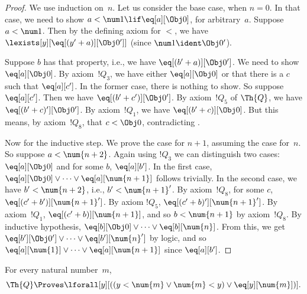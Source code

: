 \documentclass[../../../include/open-logic-section]{subfiles}
\begin{document}
\begin{proof}
We use induction on~$n$. Let us consider the base case, when $n = 0$.
In that case, we need to show $a < \num 1 \lif \eq[a][\Obj 0]$, for
arbitrary~$a$. Suppose $a < \num 1$. Then by the defining axiom for
$<$, we have $\lexists[y][\eq[(y'+a)][\Obj 0']]$ (since $\num 1 \ident
\Obj 0'$).

Suppose $b$ has that property, i.e., we have $\eq[(b'+a)][\Obj 0']$.
We need to show $\eq[a][\Obj 0]$. By axiom~$!Q_3$, we have either
$\eq[a][\Obj 0]$ or that there is a $c$ such that $\eq[a][c']$. In the
former case, there is nothing to show. So suppose $\eq[a][c']$. Then
we have $\eq[(b' + c')][\Obj 0']$. By axiom~$!Q_5$ of $\Th{Q}$, we have
$\eq[(b'+c)'][\Obj 0']$. By axiom~$!Q_1$, we have $\eq[(b' + c)][\Obj
0]$. But this means, by axiom~$!Q_8$, that $c < \Obj 0$, contradicting
.

Now for the inductive step. We prove the case for $n+1$, assuming the
case for~$n$. So suppose $a < \num {n+2}$. Again using $!Q_3$ we can
distinguish two cases: $\eq[a][\Obj 0]$ and for some $b$,
$\eq[a][b']$. In the first case, $\eq[a][\Obj 0] \lor \dots \lor
\eq[a][\num{n+1}]$ follows trivially. In the second case, we have $b'
< \num {n+2}$, i.e., $b' < \num{n+1}'$. By axiom~$!Q_8$, for some $c$,
$\eq[(c'+b')][\num{n+1}']$. By axiom $!Q_5$,
$\eq[(c'+b)'][\num{n+1}']$. By axiom~$!Q_1$, $\eq[(c'+b)][\num{n+1}]$,
and so $b < \num{n+1}$ by axiom~$!Q_8$. By inductive hypothesis,
$\eq[b][\Obj 0] \lor \dots \lor \eq[b][\num{n}]$. From this, we get
$\eq[b'][\Obj 0'] \lor \dots \lor \eq[b'][\num{n}']$ by logic, and so
$\eq[a][\num{1}] \lor \dots \lor \eq[a][\num{n+1}]$ since
$\eq[a][b']$.
\end{proof}

\begin{lem}
   For every natural number~$m$,
  \[
  \Th{Q} \Proves
  \lforall[y][((y < \num{m} \lor \num{m} < y) \lor \eq[y][\num{m}])].
  \]
\end{lem}
\end{document}
